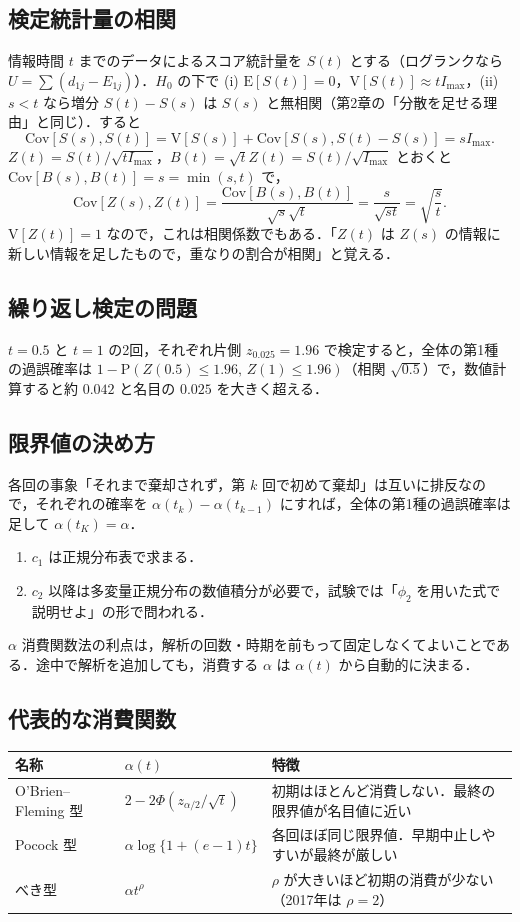 \documentclass[a4paper,11pt,openany]{ltjsbook}
\newcommand{\E}{\mathrm{E}}
\newcommand{\V}{\mathrm{V}}
\newcommand{\Cov}{\mathrm{Cov}}
\newcommand{\Prob}{\mathrm{P}}
\begin{document}
\subsection{検定統計量の相関}
情報時間 $t$ までのデータによるスコア統計量を $S(t)$ とする（ログランクなら $U=\sum(d_{1j}-E_{1j})$）．$H_0$ の下で
(i) $\E[S(t)]=0$，$\V[S(t)]\approx tI_{\max}$，(ii) $s<t$ なら増分 $S(t)-S(s)$ は $S(s)$ と無相関（第2章の「分散を足せる理由」と同じ）．すると
\[
\Cov[S(s),S(t)]=\V[S(s)]+\Cov[S(s),S(t)-S(s)]=sI_{\max}.
\]
$Z(t)=S(t)/\sqrt{tI_{\max}}$，$B(t)=\sqrt tZ(t)=S(t)/\sqrt{I_{\max}}$ とおくと $\Cov[B(s),B(t)]=s=\min(s,t)$ で，
\[
\Cov[Z(s),Z(t)]=\frac{\Cov[B(s),B(t)]}{\sqrt s\sqrt t}=\frac{s}{\sqrt{st}}=\sqrt{\frac st}.
\]
$\V[Z(t)]=1$ なので，これは相関係数でもある．「$Z(t)$ は $Z(s)$ の情報に新しい情報を足したもので，重なりの割合が相関」と覚える．

\subsection{繰り返し検定の問題}
$t=0.5$ と $t=1$ の2回，それぞれ片側 $z_{0.025}=1.96$ で検定すると，全体の第1種の過誤確率は $1-\Prob(Z(0.5)\le1.96,\,Z(1)\le1.96)$（相関 $\sqrt{0.5}$）で，数値計算すると約 $0.042$ と名目の $0.025$ を大きく超える．

\subsection{限界値の決め方}
各回の事象「それまで棄却されず，第 $k$ 回で初めて棄却」は互いに排反なので，それぞれの確率を $\alpha(t_k)-\alpha(t_{k-1})$ にすれば，全体の第1種の過誤確率は足して $\alpha(t_K)=\alpha$．
\begin{enumerate}
\item $c_1$ は正規分布表で求まる．
\item $c_2$ 以降は多変量正規分布の数値積分が必要で，試験では「$\phi_2$ を用いた式で説明せよ」の形で問われる．
\end{enumerate}
$\alpha$ 消費関数法の利点は，解析の回数・時期を前もって固定しなくてよいことである．途中で解析を追加しても，消費する $\alpha$ は $\alpha(t)$ から自動的に決まる．

\subsection{代表的な消費関数}
\begin{center}\small
\begin{tabular}{@{}llL{70mm}@{}}
\toprule
名称 & $\alpha(t)$ & 特徴\\
\midrule
O'Brien--Fleming 型 & $2-2\Phi(z_{\alpha/2}/\sqrt t)$ & 初期はほとんど消費しない．最終の限界値が名目値に近い\\
Pocock 型 & $\alpha\log\{1+(e-1)t\}$ & 各回ほぼ同じ限界値．早期中止しやすいが最終が厳しい\\
べき型 & $\alpha t^\rho$ & $\rho$ が大きいほど初期の消費が少ない（2017年は $\rho=2$）\\
\bottomrule
\end{tabular}
\end{center}
\end{document}
